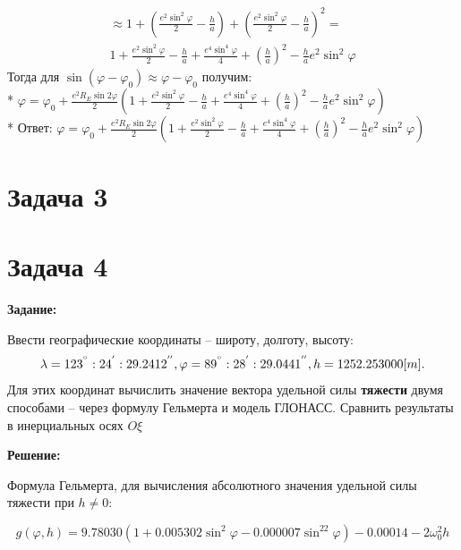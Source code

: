 \documentclass[a4paper,14pt]{article}
\theoremstyle{plain} %
\theoremstyle{definition} %
\theoremstyle{remark} %
\begin{document}
{\begin{align*}
    \approx1+(\frac{e^2\sin^2\varphi}{2}-\frac{h}{a})+(\frac{e^2\sin^2\varphi}{2}-\frac{h}{a})^2=                                             \\
    1+\frac{e^2\sin^2\varphi}{2}-\frac{h}{a}+\frac{e^4\sin^4\varphi}{4}+(\frac{h}{a})^2-\frac{h}{a}e^2\sin^2\varphi
\end{align*}
Тогда для $\sin(\varphi-\varphi_0)\approx\varphi-\varphi_0$ получим:\\*
$\varphi=\varphi_0+\frac{e^2R_E\sin2\varphi}{2}(1+\frac{e^2\sin^2\varphi}{2}-\frac{h}{a}+\frac{e^4\sin^4\varphi}{4}+(\frac{h}{a})^2-\frac{h}{a}e^2\sin^2\varphi)$ \\*
Ответ: $\varphi=\varphi_0+\frac{e^2R_E\sin2\varphi}{2}(1+\frac{e^2\sin^2\varphi}{2}-\frac{h}{a}+\frac{e^4\sin^4\varphi}{4}+(\frac{h}{a})^2-\frac{h}{a}e^2\sin^2\varphi)$


\section{Задача 3}
\section{Задача 4}
\textbf{Задание:}

Ввести географические координаты -- широту, долготу, высоту:
\[
    \lambda=123^{\degree}:24^{'}:29.2412^{''}, \varphi=89^{\degree}:28^{'}:29.0441^{''}, h=1252.253000[m].
\]
Для этих координат вычислить значение вектора удельной силы
\textbf{тяжести} двумя способами -- через формулу Гельмерта и модель ГЛОНАСС.
Сравнить результаты в инерциальных осях $O\xi$

\textbf{Решение:}

Формула Гельмерта, для вычисления абсолютного значения удельной силы тяжести при $h\neq0$:

\[
    g(\varphi,h)=9.78030(1+0.005302\sin^2\varphi-0.000007\sin^22\varphi)-0.00014-2\omega^2_0h
\]

}
\end{document}
